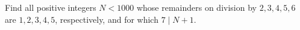 Find all positive integers $N<1000$ whose remainders on division by $2,3,4,5,6$ are $1,2,3,4,5$, respectively, and for which $7\mid N+1$.
